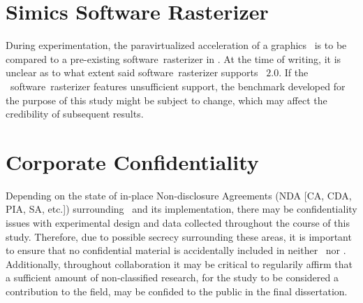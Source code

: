 
\section{Simics Software Rasterizer}
\label{sec:risksandliabilities_simicssoftwarerasterizer}
During experimentation, the paravirtualized acceleration of a graphics \termapi\ is to be compared to a pre-existing software~rasterizer in \termsimics .
At the time of writing, it is unclear as to what extent said software~rasterizer supports \termopengles ~$2.0$.
If the \termsimics\ software~rasterizer features unsufficient support, the benchmark developed for the purpose of this study might be subject to change, which may affect the credibility of subsequent results.



\section{Corporate Confidentiality}
\label{sec:risksandliabilities_corporateconfidentiality}
Depending on the state of in-place Non-disclosure Agreements (NDA [CA, CDA, PIA, SA, etc.]) surrounding \termsimics\ and its implementation, there may be confidentiality issues with experimental design and data collected throughout the course of this study.
Therefore, due to possible secrecy surrounding these areas, it is important to ensure that no confidential material is accidentally included in neither \termproposal\ nor \termthesis .
Additionally, throughout collaboration it may be critical to regularily affirm that a sufficient amount of non-classified research, for the study to be considered a contribution to the field, may be confided to the public in the final dissertation.

